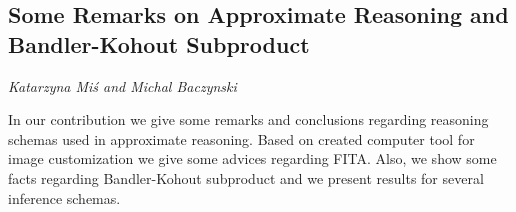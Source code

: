 \documentclass[../booklet.tex]{subfiles}
\begin{document}
\subsection[Some Remarks on Approximate Reasoning and Bandler-Kohout Subproduct. {\it Katarzyna Miś and Michal Baczynski}]{Some Remarks on Approximate Reasoning and Bandler-Kohout Subproduct}
 

\begin{center}
  {\it Katarzyna Miś and Michal Baczynski}
\end{center}



In our contribution we give some remarks and conclusions regarding reasoning schemas used in approximate reasoning. Based on created computer tool for image customization we give some advices regarding FITA. Also, we show some facts regarding Bandler-Kohout subproduct and we present results for several inference schemas.

\end{document}
